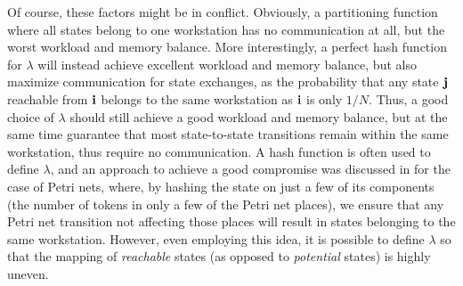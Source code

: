 \documentclass[copyright,creativecommons]{eptcs}
\begin{document}
Of course, these factors might be in conflict.
Obviously, a partitioning function where all states belong to one workstation
has no communication at all, but the worst workload and memory balance.
More interestingly, a perfect hash function for $\lambda$ will instead
achieve excellent workload and memory balance, but also maximize
communication for state exchanges,
as the probability that any state $\mathbf{j}$ reachable from $\mathbf{i}$ belongs
to the same workstation as $\mathbf{i}$ is only $1/N$.
Thus, a good choice of $\lambda$ should still achieve a good
workload and memory balance, but at the same time guarantee that
most state-to-state transitions remain within the same workstation,
thus require no communication.
A hash function is often used to define $\lambda$,
and an approach to achieve a good compromise was
discussed in \cite{1998INFORMSJC-DistrGen} for the case of Petri
nets, where, by hashing the state on just a few of its components (the
number of tokens in only a few of the Petri net places), we ensure that
any Petri net transition not affecting those places will result in states
belonging to the same workstation.
However, even employing this idea, it is possible to define $\lambda$
so that the mapping of \emph{reachable} states (as opposed to \emph{potential}
states) is highly uneven.
\end{document}
